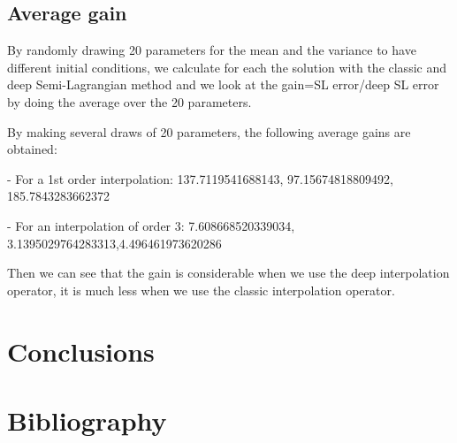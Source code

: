 \documentclass{article}
\begin{document}
\newlength{\customspace}
\setlength{\customspace}{2em}
\hspace{\customspace} 
\newpage

\subsection{Average gain}

By randomly drawing 20 parameters for the mean and the variance to have different initial conditions, we calculate for each the solution with the classic and deep Semi-Lagrangian method and we look at the gain=SL error/deep SL error by doing the average over the 20 parameters.\newline 

By making several draws of 20 parameters, the following average gains are obtained:

- For a 1st order interpolation: 137.7119541688143, 97.15674818809492, 185.7843283662372

- For an interpolation of order 3: 7.608668520339034, 3.1395029764283313,4.496461973620286

Then we can see that the gain is considerable when we use the deep interpolation operator, it is much less when we use the classic interpolation operator.\\



\section{Conclusions}


\section{Bibliography}

\end{document}
